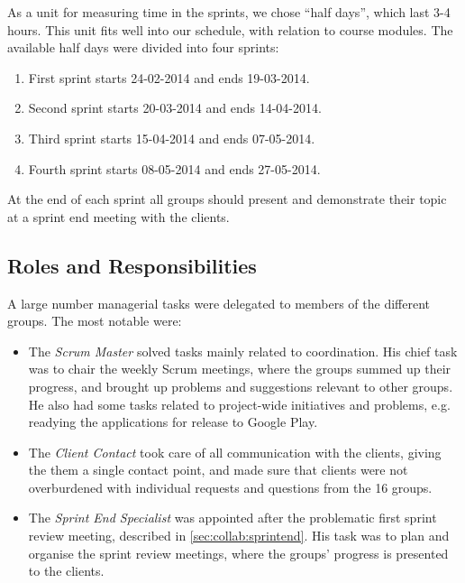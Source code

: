 As a unit for measuring time in the sprints, we chose ``half days'', which last 3-4 hours. 
This unit fits well into our schedule, with relation to course modules.
The available half days were divided into four sprints:

\begin{enumerate}
\item First sprint starts 24-02-2014 and ends 19-03-2014.
\item Second sprint starts 20-03-2014 and ends 14-04-2014.
\item Third sprint starts 15-04-2014 and ends 07-05-2014.
\item Fourth sprint starts 08-05-2014 and ends 27-05-2014.
\end{enumerate}

At the end of each sprint all groups should present and demonstrate their topic at a sprint end meeting with the clients.

\subsection{Roles and Responsibilities}
\label{sec:collab:multiproject:roles}
A large number managerial tasks were delegated to members of the different groups. 
The most notable were:
\begin{itemize}
	\item The \textit{Scrum Master} solved tasks mainly related to coordination. 
	His chief task was to chair the weekly Scrum meetings, where the groups summed up their progress, and brought up problems and suggestions relevant to other groups. 
	He also had some tasks related to project-wide initiatives and problems, e.g. readying the applications for release to Google Play.
	\item The \textit{Client Contact} took care of all communication with the clients, giving the them a single contact point, and made sure that clients were not overburdened with individual requests and questions from the 16 groups. 
	\item The \textit{Sprint End Specialist} was appointed after the problematic first sprint review meeting, described in \cref{sec:collab:sprintend}. 
	His task was to plan and organise the sprint review meetings, where the groups' progress is presented to the clients.
\end{itemize}
